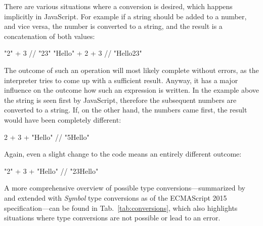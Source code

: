 \noindent
There are various situations where a conversion is desired, which happens implicitly in JavaScript. For example if a string should be added to a number, and vice versa, the number is converted to a string, and the result is a concatenation of both values:
\begin{JsCode}[numbers=none]
"2" + 3 // "23"
"Hello" + 2 + 3 // "Hello23"
\end{JsCode}
The outcome of such an operation will most likely complete without errors, as the interpreter tries to come up with a sufficient result. Anyway, it has a major influence on the outcome how such an expression is written. In the example above the string is seen first by JavaScript, therefore the subsequent numbers are converted to a string. If, on the other hand, the numbers came first, the result would have been completely different:
\begin{JsCode}[numbers=none]
2 + 3 + "Hello" // "5Hello"
\end{JsCode}
Again, even a slight change to the code means an entirely different outcome:
\begin{JsCode}[numbers=none]
"2" + 3 + "Hello" // "23Hello"
\end{JsCode}
A more comprehensive overview of possible type conversions---summarized by \citeauthor{JavaScriptTheDefinitiveGuide:Flanagan:2011} and extended with \emph{Symbol} type conversions as of the ECMAScript 2015 specification---can be found in Tab.~\ref{tab:conversions}, which also highlights situations where type conversions are not possible or lead to an error.

